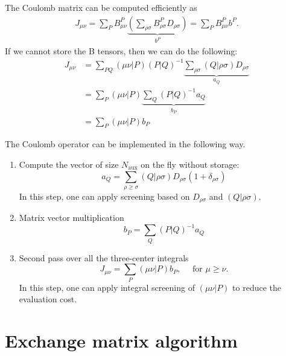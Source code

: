 \documentclass[aip,preprint]{revtex4-1}
\begin{document}
The Coulomb matrix can be computed efficiently as
\begin{equation}
\begin{split}
J_{\mu \nu} = \sum_{P} B^{P}_{\mu \nu}
\underbrace{\left( \sum_{\rho \sigma}B^{P}_{\rho \sigma} D_{\rho \sigma} \right)}_{b^P}=
\sum_{P} B^{P}_{\mu \nu} b^P.
\end{split}
\end{equation}
If we cannot store the B tensors, then we can do the following:
\begin{equation}
\begin{split}
J_{\mu \nu} & = \sum_{PQ} (\mu \nu | P) (P|Q)^{-1}
\underbrace{\sum_{\rho \sigma} (Q|\rho \sigma) D_{\rho \sigma}}_{a_Q} \\
 & = \sum_{P} (\mu \nu | P) \underbrace{\sum_{Q} (P|Q)^{-1} a_Q}_{b_P} \\
 & = \sum_{P} (\mu \nu | P) b_P
\end{split}
\end{equation}

The Coulomb operator can be implemented in the following way.
\begin{enumerate}
    \item Compute the vector of size $N_\mathrm{aux}$ on the fly without storage:
\begin{equation}
a_Q = \sum_{\rho \geq \sigma} (Q|\rho \sigma) D_{\rho \sigma} (1+\delta_{\rho \sigma})
\end{equation}
In this step, one can apply screening based on $D_{\rho \sigma}$ and $(Q|\rho \sigma)$. 

    \item Matrix vector multiplication
\begin{equation}
b_P = \sum_{Q} (P|Q)^{-1} a_Q
\end{equation}
    \item Second pass over all the three-center integrals
\begin{equation}
J_{\mu \nu} = \sum_{P} (\mu \nu | P) b_P, \quad \text{ for } \mu \geq \nu.
\end{equation}
In this step, one can apply integral screening of $(\mu \nu | P)$ to reduce the evaluation cost.
\end{enumerate}

\section{Exchange matrix algorithm}
\end{document}
